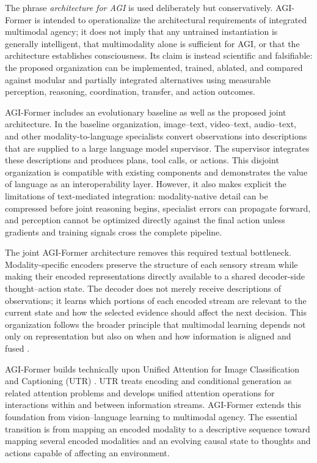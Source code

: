 The phrase \textit{architecture for AGI} is used deliberately but conservatively. AGI-Former is intended to operationalize the architectural requirements of integrated multimodal agency; it does not imply that any untrained instantiation is generally intelligent, that multimodality alone is sufficient for AGI, or that the architecture establishes consciousness. Its claim is instead scientific and falsifiable: the proposed organization can be implemented, trained, ablated, and compared against modular and partially integrated alternatives using measurable perception, reasoning, coordination, transfer, and action outcomes.

AGI-Former includes an evolutionary baseline as well as the proposed joint architecture. In the baseline organization, image--text, video--text, audio--text, and other modality-to-language specialists convert observations into descriptions that are supplied to a large language model supervisor. The supervisor integrates these descriptions and produces plans, tool calls, or actions. This disjoint organization is compatible with existing components and demonstrates the value of language as an interoperability layer. However, it also makes explicit the limitations of text-mediated integration: modality-native detail can be compressed before joint reasoning begins, specialist errors can propagate forward, and perception cannot be optimized directly against the final action unless gradients and training signals cross the complete pipeline.

The joint AGI-Former architecture removes this required textual bottleneck. Modality-specific encoders preserve the structure of each sensory stream while making their encoded representations directly available to a shared decoder-side thought--action state. The decoder does not merely receive descriptions of observations; it learns which portions of each encoded stream are relevant to the current state and how the selected evidence should affect the next decision. This organization follows the broader principle that multimodal learning depends not only on representation but also on when and how information is aligned and fused \cite{baltrusaitis2019multimodal}.

AGI-Former builds technically upon Unified Attention for Image Classification and Captioning (UTR) \cite{zohourian2026utr}. UTR treats encoding and conditional generation as related attention problems and develops unified attention operations for interactions within and between information streams. AGI-Former extends this foundation from vision--language learning to multimodal agency. The essential transition is from mapping an encoded modality to a descriptive sequence toward mapping several encoded modalities and an evolving causal state to thoughts and actions capable of affecting an environment.

